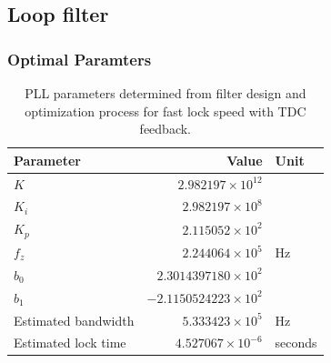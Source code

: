 \FloatBarrier\pagebreak
\subsection{Loop filter }
	\subsubsection{Optimal Paramters}
		\begin{table}[h!]
			\centering
			\def\arraystretch{1.5}		
			\setlength\arrayrulewidth{0.75pt}
			\setlength{\tabcolsep}{1em} %
			\begin{tabular}{|l|r|l|}
				\hline 
				\rule[-1ex]{0pt}{2.5ex} \cellcolor{gray!40}\textbf{Parameter} & \cellcolor{gray!40}\textbf{Value} & \cellcolor{gray!40}\textbf{Unit }\\ 
				\hline 
				\rule[-1ex]{0pt}{2.5ex} \textbf{$K$}  & $2.982197\times10^{12}$ &  \\
				\hline 
				\rule[-1ex]{0pt}{2.5ex} \textbf{$K_i$}  & $2.982197\times10^{8}$ &  \\
				\hline 
				\rule[-1ex]{0pt}{2.5ex} \textbf{$K_p$}  & $2.115052\times10^{2}$ &  \\
				\hline 
				\rule[-1ex]{0pt}{2.5ex} \textbf{$f_z$} & $2.244064\times10^5$ & Hz\\
				\hline 
				\rule[-1ex]{0pt}{2.5ex} \textbf{$b_0$}  & $2.3014397180\times10^2$  &\\
				\hline 
				\rule[-1ex]{0pt}{2.5ex} \textbf{$b_1$}  & $-2.1150524223\times10^2$  & \\
				\hline 
				\rule[-1ex]{0pt}{2.5ex} Estimated bandwidth & $5.333423\times10^5$ & Hz \\
				\hline 
				\rule[-1ex]{0pt}{2.5ex} Estimated lock time & $4.527067\times10^{-6}$ & seconds \\
				\hline 
			\end{tabular} 
			\caption{PLL parameters determined from filter design and optimization process for fast lock speed with TDC feedback.}
			\label{filter_params_fast_lock}
		\end{table}   


